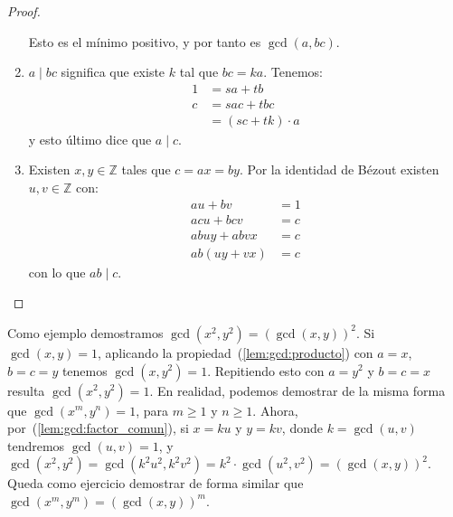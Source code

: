 \begin{proof}
\begin{enumerate}
      Esto es el mínimo positivo,
      y por tanto es \(\gcd(a, b c)\).
    \item
      \(a \mid b c\) significa que existe \(k\) tal que \(b c = k a\).
      Tenemos:
      \begin{align*}
	1
	  &= s a + t b \\
	c
	  &= s a c + t b c \\
	  &= (s c + t k) \cdot a
      \end{align*}
      y esto último dice que \(a \mid c\).
    \item
      Existen \(x, y \in \mathbb{Z}\) tales que \(c = a x = b y\).
      Por la identidad de Bézout
      existen \(u, v \in \mathbb{Z}\) con:
      \begin{align*}
	a u + b v
	  &= 1 \\
	a c u + b c v
	  &= c \\
	a b u y + a b v x
	  &= c \\
	a b (u y + v x)
	  &= c
      \end{align*}
      con lo que \(a b \mid c\).
      \qedhere
    \end{enumerate}
  \end{proof}

  Como ejemplo
  demostramos \(\gcd(x^2, y^2) = \left(\gcd(x, y)\right)^2\).
  Si \(\gcd(x, y) = 1\),
  aplicando la propiedad~(\ref{lem:gcd:producto})
  con \(a = x\), \(b = c = y\)
  tenemos \(\gcd(x, y^2) = 1\).
  Repitiendo esto con \(a = y^2\) y \(b = c = x\)
  resulta \(\gcd(x^2, y^2) = 1\).
  En realidad,
  podemos demostrar de la misma forma que \(\gcd(x^m, y^n) = 1\),
  para \(m \ge 1\) y \(n \ge 1\).
  Ahora,
  por~(\ref{lem:gcd:factor_comun}),
  si \(x = k u\) y \(y = k v\),
  donde \(k = \gcd(u, v)\) tendremos \(\gcd(u, v) = 1\),
  y \(\gcd(x^2, y^2) = \gcd(k^2 u^2, k^2 v^2)
		     = k^2 \cdot \gcd(u^2, v^2)
		     = \left(\gcd(x, y)\right)^2\).
  Queda como ejercicio demostrar de forma similar
  que \(\gcd(x^m, y^m) = \left(\gcd(x, y)\right)^m\).

